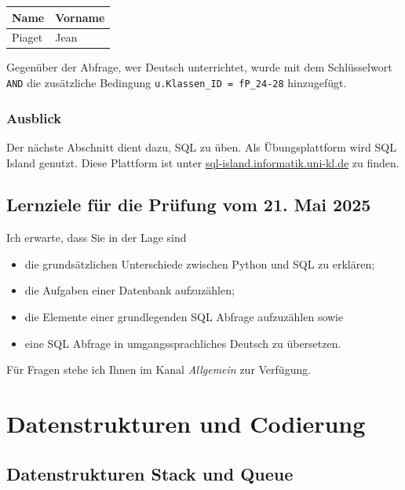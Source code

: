 \documentclass[
  nswissgerman,
  a4paper,
  DIV=11,
  numbers=noendperiod,
  ngerman]{scrreprt}
\newcounter{none} %
\providecommand{\tightlist}{%
  \setlength{\itemsep}{0pt}\setlength{\parskip}{0pt}}
\begin{document}
{\def\LTcaptype{none} %
\begin{longtable}[]{@{}ll@{}}
\toprule\noalign{}
Name & Vorname \\
\midrule\noalign{}
\endhead
\bottomrule\noalign{}
\endlastfoot
Piaget & Jean \\
\end{longtable}
}

Gegenüber der Abfrage, wer Deutsch unterrichtet, wurde mit dem
Schlüsselwort \texttt{AND} die zusätzliche Bedingung
\texttt{u.Klassen\_ID\ =\ \textquotesingle{}fP\_24-28\textquotesingle{}}
hinzugefügt.

\section{Ausblick}\label{ausblick-1}

Der nächste Abschnitt dient dazu, SQL zu üben. Als Übungsplattform wird
SQL Island genutzt. Diese Plattform ist unter
\href{https://sql-island.informatik.uni-kl.de/}{sql-island.informatik.uni-kl.de}
zu finden.

\chapter{Lernziele für die Prüfung vom 21. Mai
2025}\label{lernziele-fuxfcr-die-pruxfcfung-vom-21.-mai-2025}

Ich erwarte, dass Sie in der Lage sind

\begin{itemize}
\tightlist
\item
  die grundsätzlichen Unterschiede zwischen Python und SQL zu erklären;
\item
  die Aufgaben einer Datenbank aufzuzählen;
\item
  die Elemente einer grundlegenden SQL Abfrage aufzuzählen sowie
\item
  eine SQL Abfrage in umgangssprachliches Deutsch zu übersetzen.
\end{itemize}

Für Fragen stehe ich Ihnen im Kanal \emph{Allgemein} zur Verfügung.

\part{Datenstrukturen und Codierung}

\chapter{Datenstrukturen Stack und
Queue}\label{datenstrukturen-stack-und-queue}
\end{document}
